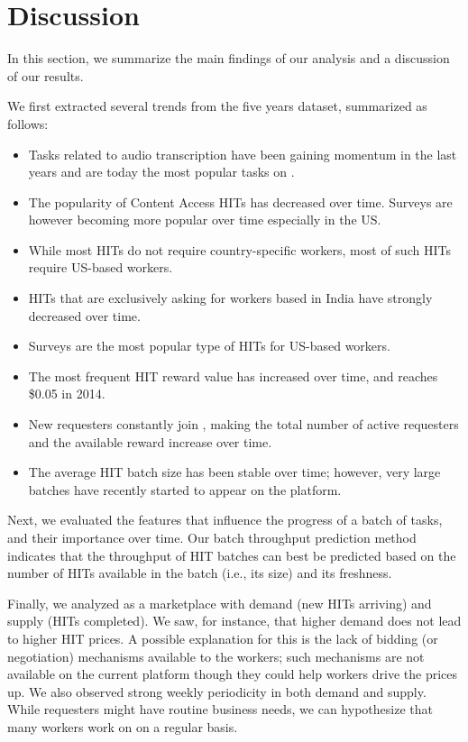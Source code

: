 \section{Discussion}
\label{sec:discuss}

In this section, we summarize the main findings of our analysis and a discussion of our results.

We first extracted several trends from the five years dataset, summarized as follows:
\begin{itemize}[noitemsep,topsep=0pt,parsep=0pt,partopsep=0pt]
	\item Tasks related to audio transcription have been gaining momentum in the last years and are today the most popular tasks on \amt{}.
	\item The popularity of Content Access HITs has decreased over time. Surveys are however becoming more popular over time especially in the US.
	\item While most HITs do not require country-specific workers, most of such HITs require US-based workers.
	\item HITs that are exclusively asking for workers based in India have strongly decreased over time.
	\item Surveys are the most popular type of HITs for US-based workers.
	\item The most frequent HIT reward value has increased over time, and reaches \$0.05 in 2014.
	\item New requesters constantly join \amt{}, making the total number of active requesters and the available reward increase over time.
	\item The average HIT batch size has been stable over time; however, very large batches have recently started to appear on the platform.
\end{itemize}

Next, we evaluated the features that influence the progress of a batch of tasks, and their importance over time. Our batch throughput prediction method indicates that the throughput of HIT batches can best be predicted based on the number of HITs available in the batch (i.e., its size) and its freshness.

Finally, we analyzed \amt{} as a marketplace with demand (new HITs arriving) and supply (HITs completed). We saw, for instance, that higher demand does not lead to higher HIT prices. A possible explanation for this is the lack of bidding (or negotiation) mechanisms available to the workers; such mechanisms are not available on the current platform though they could help workers drive the prices up. We also observed strong weekly periodicity in both demand and supply. While requesters might have routine business needs, we can hypothesize that many workers work on \amt{} on a regular basis.